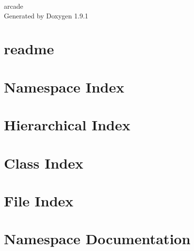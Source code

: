 \let\mypdfximage\pdfximage\def\pdfximage{\immediate\mypdfximage}\documentclass[twoside]{book}
\newcommand{\+}{\discretionary{\mbox{\scriptsize$\hookleftarrow$}}{}{}}
\newcommand{\clearemptydoublepage}{%
  \newpage{\pagestyle{empty}\cleardoublepage}%
}
\begin{document}
\raggedbottom

\hypersetup{pageanchor=false,
             bookmarksnumbered=true,
             pdfencoding=unicode
            }
\begin{titlepage}
\vspace*{7cm}
\begin{center}%
{\Large arcade }\\
\vspace*{1cm}
{\large Generated by Doxygen 1.9.1}\\
\end{center}
\end{titlepage}
\clearemptydoublepage
{}
\tableofcontents
\clearemptydoublepage
{}
\hypersetup{pageanchor=true}

\chapter{readme}
\label{md_readme}

\chapter{Namespace Index}

\chapter{Hierarchical Index}

\chapter{Class Index}

\chapter{File Index}

\chapter{Namespace Documentation}


















\end{document}
